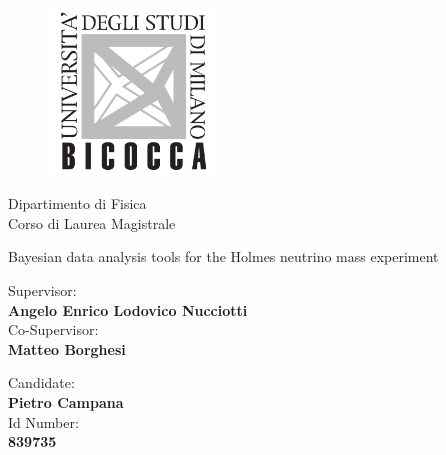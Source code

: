\begin{titlepage}
\vspace{1cm}
\begin{figure}[H]
    \centering
    \includegraphics[width=0.4\textwidth]{figures/logo.png}
\end{figure}
\begin{center}
    {\Large{Dipartimento di Fisica}}\\
    \vspace{0.3cm}
    {\Large{Corso di Laurea Magistrale}}
\end{center}
\vspace{1cm}

\begin{center}
    {\Huge {Bayesian data analysis tools for the Holmes neutrino mass experiment}}
\end{center}

\vspace{2cm}

\begin{minipage}[t]{0.47\textwidth}\raggedright
	{\large{Supervisor:\\ \bf Angelo Enrico Lodovico Nucciotti}}
    \vspace{0.5cm}
    {\large{\\Co-Supervisor:\\\bf  Matteo Borghesi}}
\end{minipage}\hfill
\begin{minipage}[t]{0.47\textwidth}\raggedleft
	{\large{Candidate: \\ \bf Pietro Campana}}
    \vspace{0.5cm}
	{\large{ \\ Id Number: \\ \bf 839735 }}
\end{minipage}

\vspace{35mm}

\end{titlepage}
